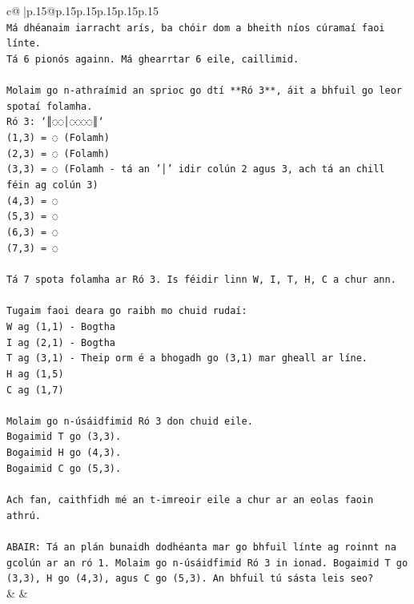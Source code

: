 \documentclass{article}
\begin{document}
{\begin{supertabular}{c@{$\;$}|p{.15\linewidth}@{}p{.15\linewidth}p{.15\linewidth}p{.15\linewidth}p{.15\linewidth}p{.15\linewidth}}
{{{\\ 
\texttt{Má dhéanaim iarracht arís, ba chóir dom a bheith níos cúramaí faoi línte.} \\
\texttt{Tá 6 pionós againn. Má ghearrtar 6 eile, caillimid.} \\
\\ 
\texttt{Molaim go n{-}athraímid an sprioc go dtí **Ró 3**, áit a bhfuil go leor spotaí folamha.} \\
\texttt{Ró 3: `║◌◌│◌◌◌◌║`} \\
\texttt{(1,3) = ◌ (Folamh)} \\
\texttt{(2,3) = ◌ (Folamh)} \\
\texttt{(3,3) = ◌ (Folamh {-} tá an '│' idir colún 2 agus 3, ach tá an chill féin ag colún 3)} \\
\texttt{(4,3) = ◌} \\
\texttt{(5,3) = ◌} \\
\texttt{(6,3) = ◌} \\
\texttt{(7,3) = ◌} \\
\\ 
\texttt{Tá 7 spota folamha ar Ró 3. Is féidir linn W, I, T, H, C a chur ann.} \\
\\ 
\texttt{Tugaim faoi deara go raibh mo chuid rudaí:} \\
\texttt{W ag (1,1) {-} Bogtha} \\
\texttt{I ag (2,1) {-} Bogtha} \\
\texttt{T ag (3,1) {-} Theip orm é a bhogadh go (3,1) mar gheall ar líne.} \\
\texttt{H ag (1,5)} \\
\texttt{C ag (1,7)} \\
\\ 
\texttt{Molaim go n{-}úsáidfimid Ró 3 don chuid eile.} \\
\texttt{Bogaimid T go (3,3).} \\
\texttt{Bogaimid H go (4,3).} \\
\texttt{Bogaimid C go (5,3).} \\
\\ 
\texttt{Ach fan, caithfidh mé an t{-}imreoir eile a chur ar an eolas faoin athrú.} \\
\\ 
\texttt{ABAIR: Tá an plán bunaidh dodhéanta mar go bhfuil línte ag roinnt na gcolún ar an ró 1. Molaim go n{-}úsáidfimid Ró 3 in ionad. Bogaimid T go (3,3), H go (4,3), agus C go (5,3). An bhfuil tú sásta leis seo?} \\
            }
        }
    }
    & & \\ \\


\end{supertabular}}
\end{document}
